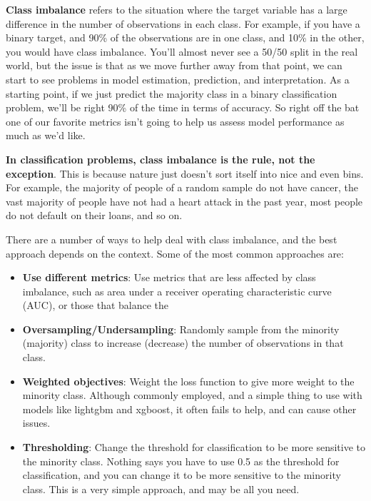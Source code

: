 \documentclass[
  letterpaper,
]{krantz}
\providecommand{\tightlist}{%
  \setlength{\itemsep}{0pt}\setlength{\parskip}{0pt}}\usepackage{longtable,booktabs,array}
\begin{document}
\textbf{Class imbalance} refers to the situation where the target
variable has a large difference in the number of observations in each
class. For example, if you have a binary target, and 90\% of the
observations are in one class, and 10\% in the other, you would have
class imbalance. You'll almost never see a 50/50 split in the real
world, but the issue is that as we move further away from that point, we
can start to see problems in model estimation, prediction, and
interpretation. As a starting point, if we just predict the majority
class in a binary classification problem, we'll be right 90\% of the
time in terms of accuracy. So right off the bat one of our favorite
metrics isn't going to help us assess model performance as much as we'd
like.

\textbf{In classification problems, class imbalance is the rule, not the
exception}. This is because nature just doesn't sort itself into nice
and even bins. For example, the majority of people of a random sample do
not have cancer, the vast majority of people have not had a heart attack
in the past year, most people do not default on their loans, and so on.

There are a number of ways to help deal with class imbalance, and the
best approach depends on the context. Some of the most common approaches
are:

\begin{itemize}
\tightlist
\item
  \textbf{Use different metrics}: Use metrics that are less affected by
  class imbalance, such as area under a receiver operating
  characteristic curve (AUC), or those that balance the
\item
  \textbf{Oversampling/Undersampling}: Randomly sample from the minority
  (majority) class to increase (decrease) the number of observations in
  that class.
\item
  \textbf{Weighted objectives}: Weight the loss function to give more
  weight to the minority class. Although commonly employed, and a simple
  thing to use with models like lightgbm and xgboost, it often fails to
  help, and can cause other issues.
\item
  \textbf{Thresholding}: Change the threshold for classification to be
  more sensitive to the minority class. Nothing says you have to use 0.5
  as the threshold for classification, and you can change it to be more
  sensitive to the minority class. This is a very simple approach, and
  may be all you need.
\end{itemize}
\end{document}
